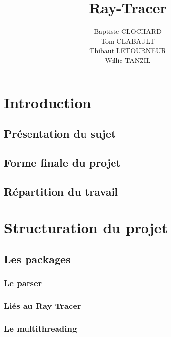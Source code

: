 \documentclass[11pt]{article}
\author{Baptiste CLOCHARD \\
    Tom CLABAULT\\
    Thibaut LETOURNEUR\\
    Willie TANZIL}
\title{Ray-Tracer}
\date{}
\begin{document}
\maketitle
\newpage
\tableofcontents
\newpage

\maketitle

\section{Introduction}

    \subsection{Présentation du sujet}
    \subsection{Forme finale du projet}
    \subsection{Répartition du travail}

%

\section{Structuration du projet}
    \subsection{Les packages}
        \subsubsection{Le parser}
        \subsubsection{Liés au Ray Tracer}
            

        \subsubsection{Le multithreading}
	  
\end{document}
